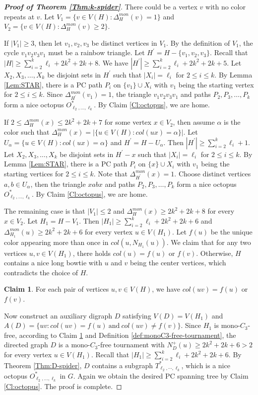 \documentclass[11pt,a4paper]{article}
\theoremstyle{definition}
\newtheorem{claimA}[lemmaA]{Claim}
\begin{document}
\begin{proof}[\textbf{Proof of Theorem \ref{Thm:k-spider}}]
There could be a vertex $v$ with no color repeats at $v$. Let $V_1=\{v\in V(H): \Delta^{mon}_H(v)=1\}$ and $V_2=\{v\in V(H): \Delta^{mon}_H(v)\geq 2\}$.

If $|V_1|\geq 3$, then let $v_1,v_2,v_3$ be distinct vertices in $V_1$. By the definition of $V_1$, the cycle $v_1v_2v_3v_1$ must be a rainbow triangle. Let $H^\prime=H-\{v_1,v_2,v_3\}$. Recall that $|H|\geq \sum_{i=2}^k\ell_i+2k^2+2k+8$. We have $|H^\prime|\geq \sum_{i=2}^k\ell_i+2k^2+2k+5$. Let $X_2, X_3,\ldots, X_k$ be disjoint sets in $H^\prime$ such that $|X_i|=\ell_i$ for $2\leq i\leq k$. By Lemma \ref{Lem:STAR}, there is a PC path $P_i$ on $\{v_1\}\cup X_i$ with $v_1$ being the starting vertex for $2\leq i\leq k$. Since $\Delta^{mon}_{H^\prime}(v_1)=1$, the triangle $v_1v_2v_3v_1$ and paths $P_2,P_3,\ldots,P_k$ form a nice octopus $O^*_{ \ell_2, \ldots, \ell_k}$. By Claim \ref{Cl:octopus}, we are home.

If $2\leq \Delta^{mon}_{H}(x)\leq 2k^2+2k+7$ for some vertex $x\in V_2$, then assume $\alpha$ is the color such that $\Delta^{mon}_{H}(x) = |\{u\in V(H): col(ux) = \alpha\}|$.  Let $U_\alpha=\{u\in V(H): col(ux) = \alpha\}$ and $H^\prime=H-U_\alpha$. Then $|H^\prime|\geq \sum_{i=2}^k\ell_i+1$. Let $X_2, X_3,\ldots, X_k$ be disjoint sets in $H^\prime-x$ such that $|X_i|=\ell_i$ for $2\leq i\leq k$. By Lemma \ref{Lem:STAR}, there is a PC path $P_i$ on $\{x\}\cup X_i$ with $v_1$ being the starting vertices for $2\leq i\leq k$. Note that $\Delta^{mon}_{H^\prime}(x)=1$. Choose distinct vertices $a,b\in U_\alpha$, then the triangle $xabx$ and paths $P_2,P_3,\ldots,P_k$ form a nice octopus $O^*_{ \ell_2, \ldots, \ell_k}$. By Claim \ref{Cl:octopus}, we are home.

The remaining case is that $|V_1|\leq 2$ and $\Delta^{mon}_{H}(x)\geq 2k^2+2k+8$ for every $x\in V_2$. Let $H_1=H-V_1$.
Then $|H_1|\geq \sum_{i=2}^k\ell_i+2k^2+2k+6$ and $\Delta^{mon}_{H_1}(u)\geq 2k^2+2k+6$ for every vertex $u\in V(H_1)$. Let $f(u)$ be the unique color appearing more than once in $col(u,N_{H_1}(u))$. We claim that for any two vertices $u, v\in V(H_1)$,  there holds $col(u)=f(u)$ or $f(v)$. Otherwise, $H$ contains a nice long bowtie with $u$ and $v$ being the center vertices, which contradicts the choice of $H$.
\begin{claimA}\label{Cl:degenerate}
For each pair of vertices $u,v\in V(H)$, we have $col(uv)=f(u)$ or $f(v)$.
\end{claimA}
Now construct an auxiliary digraph $D$ satisfying $V(D)=V(H_1)$ and $A(D)=\{uv: col(uv)=f(u) \ \text{and}\  col(uv)\ne f(v) \}.$ Since $H_1$ is mono-$C_3$-free, according to Claim \ref{Cl:degenerate} and Definition \ref{def:monoC3-free-tournament}, the directed graph $D$ is a mono-$C_3$-free tournament with $N^+_{D}(u)\geq 2k^2+2k+6>2$ for every vertex $u\in V(H_1)$. Recall that $|H_1|\geq \sum_{i=2}^k\ell_i+2k^2+2k+6$.
By Theorem \ref{Thm:D-spider}, $D$ contains a subgraph $ T^*_{\ell_2, \cdots, \ell_k}$, which is a nice octopus $O^*_{ \ell_2,\ldots,\ell_k}$ in $G$. Again we obtain the desired PC spanning tree by Claim \ref{Cl:octopus}. The proof is complete.
\end{proof}
\end{document}
